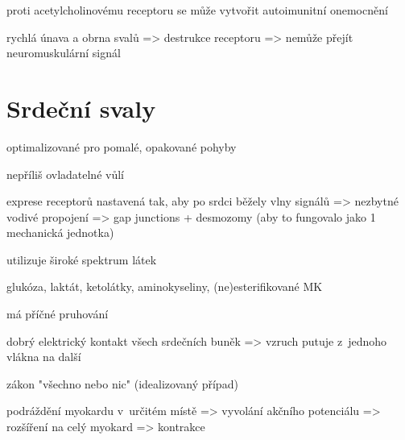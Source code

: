 \documentclass[DIV=8]{scrreprt}
\begin{document}
\begin{myItemize}[nosep]
\begin{myItemize}[nosep]
\begin{myItemize}[nosep]
\end{myItemize}

    \item proti acetylcholinovému receptoru se může vytvořit autoimunitní onemocnění
\begin{myItemize}[nosep]
    \item rychlá únava a obrna svalů
        => destrukce receptoru => nemůže přejít neuromuskulární signál
\end{myItemize}

\end{myItemize}

\end{myItemize}



\section{Srdeční svaly} \label{Srdeční svaly} \FloatBarrier


\begin{myItemize}[nosep]
    \item optimalizované pro pomalé, opakované pohyby
    \item nepříliš ovladatelné vůlí
    \item exprese receptorů nastavená tak, aby po srdci běžely vlny signálů => nezbytné vodivé propojení => gap junctions + desmozomy (aby to fungovalo jako 1 mechanická jednotka)
    \item utilizuje široké spektrum látek
\begin{myItemize}[nosep]
    \item glukóza, laktát, ketolátky, aminokyseliny, (ne)esterifikované MK
\end{myItemize}

    \item má příčné pruhování
    \item dobrý elektrický kontakt všech srdečních buněk => vzruch putuje z jednoho vlákna na další
    \item zákon "všechno nebo nic" (idealizovaný případ)
\begin{myItemize}[nosep]
    \item podráždění myokardu v určitém místě => vyvolání akčního potenciálu => rozšíření na celý myokard => kontrakce
\end{myItemize}

\end{myItemize}
\end{document}
